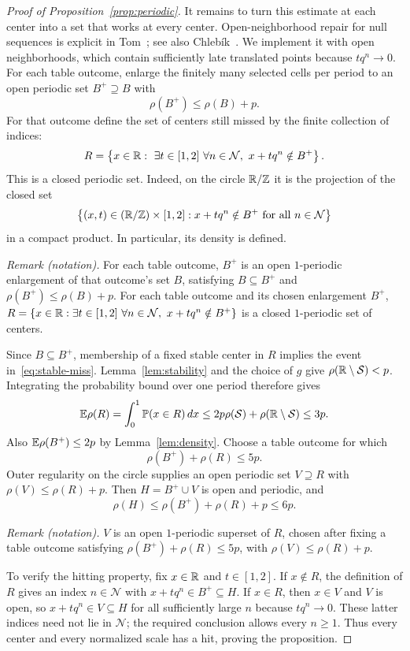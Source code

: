 \begin{proof}[Proof of Proposition~\ref{prop:periodic}]
It remains to turn this estimate at each center into a set that works
at every center. Open-neighborhood repair for null sequences is explicit
in Tom~\cite[Lemma~0.2]{Tom2015}; see also
Chleb\'ik~\cite[Section~3, final remark; Proposition~1(vi), (viii)]{Chlebik2015}.
We implement it with open neighborhoods, which contain sufficiently
late translated points because $tq^n\to0$.
For each table outcome, enlarge the finitely many
selected cells per period to an open periodic set $B^+\supseteq B$
with
\[
 \rho(B^+)\le\rho(B)+p.
\]
For that outcome define the set of centers still missed by the finite
collection of indices:
\begin{equation}\label{eq:exceptional-centers}
 R=\left\{x\in\mathbb R:\ \exists t\in[1,2]\ \forall n\in\mathcal N,
                   \ x+tq^n\notin B^+\right\}.
\end{equation}
This is a closed periodic set.  Indeed, on the circle $\mathbb R/\mathbb Z$ it is
the projection of the closed set
\[
 \left\{(x,t)\in(\mathbb R/\mathbb Z)\times[1,2]:
       x+tq^n\notin B^+\ \text{for all }n\in\mathcal N\right\}
\]
in a compact product.  In particular, its density is defined.

\noindent\textit{Remark (notation).} For each table outcome, $B^+$ is an open $1$-periodic enlargement of that outcome's set $B$, satisfying $B\subseteq B^+$ and $\rho(B^+)\le\rho(B)+p$. For each table outcome and its chosen enlargement $B^+$, $R=\{x\in\mathbb R:\exists t\in[1,2]\ \forall n\in\mathcal N,\ x+tq^n\notin B^+\}$ is a closed $1$-periodic set of centers.


Since $B\subseteq B^+$, membership of a fixed stable center in $R$
implies the event in~\eqref{eq:stable-miss}.  Lemma~\ref{lem:stability}
and the choice of $g$ give $\rho(\mathbb R\setminus\mathcal S)<p$.
Integrating the probability bound over one period therefore gives
\[
 \mathbb E\rho(R)
 =\int_0^1\mathbb P(x\in R)\,dx
 \le2p\rho(\mathcal S)+\rho(\mathbb R\setminus\mathcal S)
 \le3p.
\]
Also $\mathbb E\rho(B^+)\le2p$ by Lemma~\ref{lem:density}.
Choose a table outcome for which
\[
 \rho(B^+)+\rho(R)\le5p.
\]
Outer regularity on the circle supplies an open periodic set
$V\supseteq R$ with $\rho(V)\le\rho(R)+p$.
Then $H=B^+\cup V$ is open and periodic, and
\[
 \rho(H)\le\rho(B^+)+\rho(R)+p\le6p.
\]

\noindent\textit{Remark (notation).} $V$ is an open $1$-periodic superset of $R$, chosen after fixing a table outcome satisfying $\rho(B^+)+\rho(R)\le5p$, with $\rho(V)\le\rho(R)+p$.


To verify the hitting property, fix $x\in\mathbb R$ and $t\in[1,2]$.
If $x\notin R$, the definition of $R$ gives an index $n\in\mathcal N$
with $x+tq^n\in B^+\subseteq H$.
If $x\in R$, then $x\in V$ and $V$ is open, so
$x+tq^n\in V\subseteq H$ for all sufficiently large $n$ because
$tq^n\to0$.  These latter indices need not lie in $\mathcal N$;
the required conclusion allows every $n\ge1$.  Thus every center and
every normalized scale has a hit, proving the proposition.
\end{proof}
